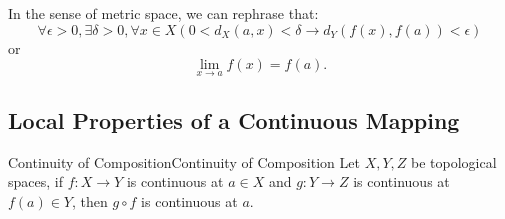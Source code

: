 \documentclass[../main.tex]{subfiles}
\begin{document}
In the sense of metric space, we can rephrase that:
\begin{equation*}
\forall \epsilon>0, \exists \delta>0, \forall x\in X (0 < d_X(a,x) <\delta \rightarrow d_Y(f(x),f(a)) <\epsilon)
\end{equation*}
or
\begin{equation*}
\lim_{x \to a} f(x) = f(a).
\end{equation*}

\subsection{Local Properties of a Continuous Mapping}

\begin{theorem}{Continuity of Composition}{Continuity of Composition}
Let $X,Y,Z$ be topological spaces, if $f:X \rightarrow Y$ is continuous at $a\in X$ and $g:Y \rightarrow Z$ is continuous at $f(a)\in Y$, then $g \circ f$ is continuous at $a$.
\end{theorem}
\end{document}
